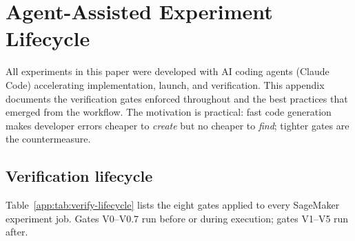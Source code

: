 \section{Agent-Assisted Experiment Lifecycle}
\label{app:agent-lifecycle}

All experiments in this paper were developed with AI coding agents
(Claude Code) accelerating implementation, launch, and verification.
This appendix documents the verification gates enforced throughout and
the best practices that emerged from the workflow. The motivation is
practical: fast code generation makes developer errors cheaper to
\emph{create} but no cheaper to \emph{find}; tighter gates are the
countermeasure.

\subsection{Verification lifecycle}

Table~\ref{app:tab:verify-lifecycle} lists the eight gates applied to
every SageMaker experiment job. Gates V0--V0.7 run before or during
execution; gates V1--V5 run after.

